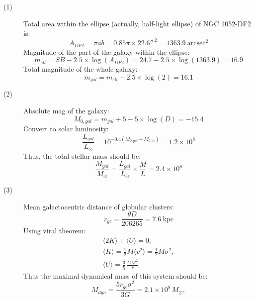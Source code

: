 \begin{description}
\item[(1)] Total area within the ellipse (actually, half-light ellipse) of
  NGC 1052-DF2 is:
  \begin{equation*}
  A_{DF2} = \pi a b = 0.85\pi \times 22.6''^{\,2}
  = 1363.9~\mathrm{arcsec^2}
  \tag*{(2 points)}
  \end{equation*}
  Magnitude of the part of the galaxy within the ellipse:
  \begin{equation*}
  m_{ell} = SB - 2.5 \times \log(A_{DF2})
  = 24.7 - 2.5 \times \log(1363.9) = 16.9
  \tag*{(2 points)}
  \end{equation*}
  Total magnitude of the whole galaxy:
  \begin{equation*}
  m_{gal} = m_{ell} - 2.5 \times \log(2) = 16.1
  \tag*{(2 points)}
  \end{equation*}
\item[(2)] Absolute mag of the galaxy:
  \begin{equation*}
  M_{0,gal} = m_{gal} + 5 - 5 \times \log(D) = -15.4
  \tag*{(2 points)}
  \end{equation*}
  Convert to solar luminosity:
  \begin{equation*}
  \frac{L_{gal}}{L_\odot} = 10^{-0.4(M_{0,gal} - M_{0,\odot})}
  = 1.2 \times 10^{8}
  \tag*{(2 points)}
  \end{equation*}
  Thus, the total stellar mass should be:
  \begin{equation*}
  \frac{M_{gal}}{M_\odot} = \frac{L_{gal}}{L_\odot} \times \frac{M}{L}
  = 2.4 \times 10^{8}
  \tag*{(2 points)}
  \end{equation*}
\item[(3)] Mean galactocentric distance of globular clusters:
  \begin{equation*}
  r_{gc} = \frac{\theta D}{206265} = 7.6~\mathrm{kpc}
  \tag*{(2 points)}
  \end{equation*}
  Using viral theorem: %
  \begin{gather*}
  \langle 2K \rangle + \langle U \rangle = 0, \\
  \langle K \rangle = \tfrac{1}{2}M\langle v^2 \rangle
  = \tfrac{1}{2}M\sigma^2, \\
  \langle U \rangle = \frac{3}{5}\,\frac{GM^2}{r}
  \tag*{(4 points)}
  \end{gather*}
  Thus the maximal dynamical mass of this system should be:
  \begin{equation*}
  M_{dyn} = \frac{5 r_{gc}\sigma^2}{3G} = 2.1 \times 10^{8}\,M_\odot,

\end{equation*}
\end{description}
